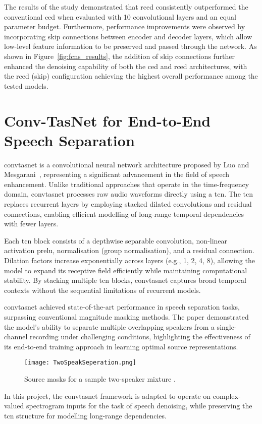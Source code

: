 The results of the study demonstrated that \gls{rced} consistently outperformed the conventional \gls{ced} when evaluated with 10 convolutional layers and an equal parameter budget. Furthermore, performance improvements were observed by incorporating skip connections between encoder and decoder layers, which allow low-level feature information to be preserved and passed through the network. As shown in Figure~\ref{fig:fcns_results}, the addition of skip connections further enhanced the denoising capability of both the \gls{ced} and \gls{rced} architectures, with the \gls{rced} (skip) configuration achieving the highest overall performance among the tested models.


\section{Conv-TasNet for End-to-End Speech Separation}
\label{sec:convtasnet_lit_review}

\gls{convtasnet} is a convolutional neural network architecture proposed by Luo and Mesgarani~\cite{luo2019conv}, representing a significant advancement in the field of speech enhancement. Unlike traditional approaches that operate in the time-frequency domain, \gls{convtasnet} processes raw audio waveforms directly using a \gls{tcn}. The \gls{tcn} replaces recurrent layers by employing stacked dilated convolutions and residual connections, enabling efficient modelling of long-range temporal dependencies with fewer layers.

Each \gls{tcn} block consists of a depthwise separable convolution, non-linear activation \gls{prelu}, normalisation (group normalisation), and a residual connection. Dilation factors increase exponentially across layers (e.g., 1, 2, 4, 8), allowing the model to expand its receptive field efficiently while maintaining computational stability. By stacking multiple \gls{tcn} blocks, \gls{convtasnet} captures broad temporal contexts without the sequential limitations of recurrent models.

\gls{convtasnet} achieved state-of-the-art performance in speech separation tasks, surpassing conventional magnitude masking methods. The paper demonstrated the model's ability to separate multiple overlapping speakers from a single-channel recording under challenging conditions, highlighting the effectiveness of its end-to-end training approach in learning optimal source representations.

\begin{figure}[H]
    \centering
    \texttt{[image: TwoSpeakSeperation.png]}
    \caption{Source masks for a sample two-speaker mixture \cite{luo2019conv}.}
    \label{fig:convtasnet}
\end{figure}

In this project, the \gls{convtasnet} framework is adapted to operate on complex-valued spectrogram inputs for the task of speech denoising, while preserving the \gls{tcn} structure for modelling long-range dependencies.
